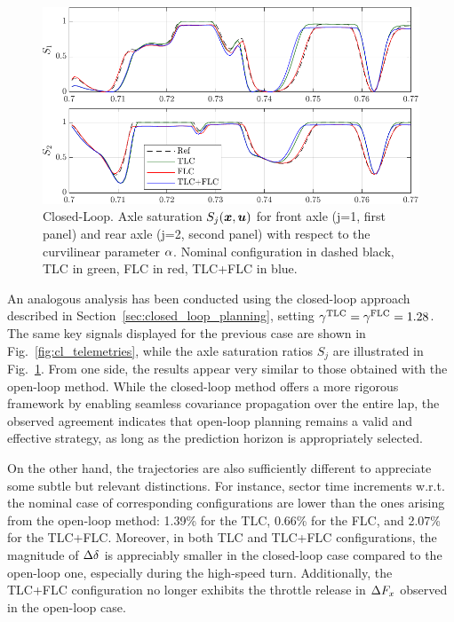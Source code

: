 \begin{figure}[b!]
	\centering
	\includegraphics[scale = 1]{Fig/cl_saturation.pdf}
	\caption{Closed-Loop. Axle saturation $S_j(\boldsymbol{x},\boldsymbol{u})$ for front axle (j=1, first panel) and rear axle (j=2, second panel) with respect to the curvilinear parameter $\alpha$. Nominal configuration in dashed black, TLC in green, FLC in red, TLC+FLC in blue.
	}
	\label{fig:cl_saturation}
\end{figure}

An analogous analysis has been conducted using the closed-loop approach described in Section~\ref{sec:closed_loop_planning}, setting $\gamma^\textrm{TLC}=\gamma^\textrm{FLC}=1.28$.
The same key signals displayed for the previous case are shown in Fig.~\ref{fig:cl_telemetries}, while the axle saturation ratios $S_j$ are illustrated in Fig.~\ref{fig:cl_saturation}.
From one side, the results appear very similar to those obtained with the open-loop method. While the closed-loop method offers a more rigorous framework by enabling seamless covariance propagation over the entire lap, the observed agreement indicates that open-loop planning remains a valid and effective strategy, as long as the prediction horizon is appropriately selected.

On the other hand, the trajectories are also sufficiently different to appreciate some subtle but relevant distinctions. For instance, sector time increments w.r.t. the nominal case of corresponding configurations are lower than the ones arising from the open-loop method: 1.39\% for the TLC, 0.66\% for the FLC, and 2.07\% for the TLC+FLC.
Moreover, in both TLC and TLC+FLC configurations, the magnitude of $\Delta\delta$ is appreciably smaller in the closed-loop case compared to the open-loop one, especially during the high-speed turn.
Additionally, the TLC+FLC configuration no longer exhibits the throttle release in $\Delta F_x$ observed in the open-loop case.

